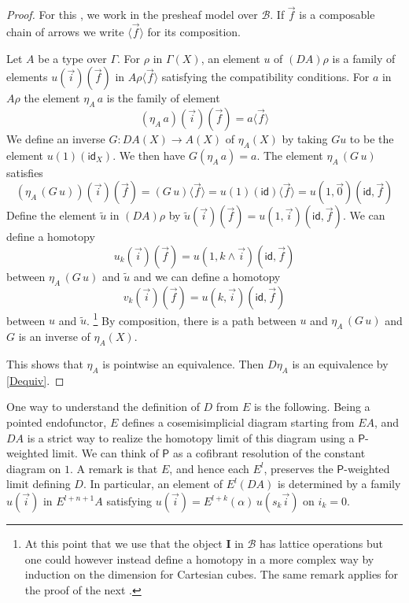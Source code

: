 \documentclass[10pt,a4paper,draft]{article}
\newcommand{\id}{\mathsf{id}}
\newcommand{\BB}{\mathcal{B}}
\newcommand{\mpF}[1]{\langle #1 \rangle} %
\newcommand{\D}{D}              %
\newcommand{\E}{E}
\renewcommand{\~}{\widetilde}
\newcommand{\PP}{\mathsf{P}}
\newcounter{diagram}
\theoremstyle{definition}
\theoremstyle{remark} %
\begin{document}
\begin{proof}
  For this , we work in the presheaf model over $\BB$.
  If $\vec{f}$ is a composable chain of arrows we write $\mpF{\vec{f}}$ for its composition.

Let $A$ be a type over $\Gamma$. For $\rho$ in $\Gamma(X)$, an element $u$
  of $(\D A)\rho$ is a family of elements $u(\vec{i})(\vec{f})$ in $A\rho \mpF{\vec{f}}$
  satisfying   the compatibility conditions.
  For $a$ in $A\rho$ the element $\eta_A\, a$ is the family
  of element
  \begin{equation*}
  (\eta_A\, a)(\vec{i})(\vec{f}) = a\mpF{\vec{f}}
  \end{equation*}
  We define an inverse $G : DA(X) \to A(X)$ of $\eta_A(X)$ by taking $Gu$ to be the element
  $u(1)(\id_X)$. We then have $G(\eta_A\, a) = a$. The element
  $\eta_A\, (G\,u)$ satisfies
  \begin{equation*}
  (\eta_A\, (G\,u))(\vec{i})(\vec{f}) = (G\,u)\mpF{\vec{f}} = u(1)(\id)\mpF{\vec{f}}
  = u(1,\vec{0})(\id,\vec{f})
  \end{equation*}
  Define the element $\tilde{u}$ in $(\D A)\rho$ by
  $\tilde{u}(\vec{i})(\vec{f}) = u(1,\vec{i})(\id,\vec{f})$.
  We can define a homotopy
  \begin{equation*}
  u_k(\vec{i})(\vec{f}) = u(1,k\wedge \vec{i})(\id,\vec{f})
  \end{equation*}
  between $\eta_A\,(G\,u)$ and $\tilde{u}$ and we can define a homotopy
  \begin{equation*}
  v_k(\vec{i})(\vec{f}) = u(k,\vec{i})(\id,\vec{f})
  \end{equation*}
  between $u$ and $\tilde{u}$.%
  \footnote{At this point that we use that the object {\bf I} in $\BB$ has lattice
  operations but one could however instead define a homotopy in a more complex way by induction on
  the dimension for Cartesian cubes. The same remark applies for the proof of the next
  .}
  By composition, there is a path between $u$ and $\eta_A\, (G\,u)$
  and $G$ is an inverse of $\eta_A(X)$.%

  This shows that $\eta_A$ is pointwise an equivalence.
  Then $D \eta_A$ is an equivalence by \cref{Dequiv}.
\end{proof}

One way to understand the definition of $\D$ from $\E$ is the following.
Being a pointed endofunctor, $\E$ defines a cosemisimplicial
diagram starting from $\E A$, and $\D A$ is a strict way to realize
the homotopy limit of this diagram using a $\PP$\hyp{}weighted limit.
We can think of $\PP$ as a cofibrant resolution of the constant diagram on $1$.
A remark is that $\E$, and hence each $\E^l$, preserves the $\PP$\hyp{}weighted limit defining $\D$.
In particular, an element of $\E^l(\D A)$ is determined
by a family %
$u(\vec{i})$ in $\E^{l+n+1}A$ satisfying
$u(\vec{i}) = \E^{l+k}(\alpha)\, u(s_k\vec{i})$ on $i_k = 0$.
\end{document}
